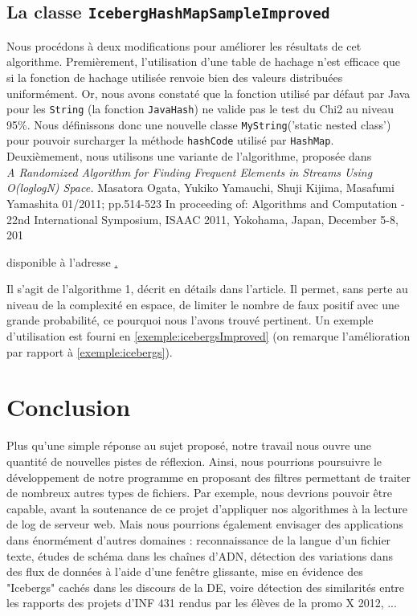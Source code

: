 \documentclass[12pt,a4paper,titlepage]{article}
\newcommand{\class}[1]{\texttt{#1}}
\begin{document}
\subsection{La classe \class{IcebergHashMapSampleImproved}}

Nous procédons à deux modifications pour améliorer les résultats de cet algorithme. Premièrement, l'utilisation d'une table de hachage n'est efficace que si la fonction de hachage utilisée renvoie bien des valeurs distribuées uniformément. Or, nous avons constaté que la fonction utilisé par défaut par Java pour les \class{String} (la fonction \class{JavaHash}) ne valide pas le test du Chi2 au niveau 95\%. Nous définissons donc une nouvelle classe \class{MyString}('static nested class') pour pouvoir surcharger la méthode \class{hashCode} utilisé par \class{HashMap}.\\

Deuxièmement, nous utilisons une variante de l'algorithme, proposée dans\\

\textit{A Randomized Algorithm for Finding Frequent Elements in Streams Using O(loglogN) Space.}
Masatora Ogata, Yukiko Yamauchi, Shuji Kijima, Masafumi Yamashita
01/2011; pp.514-523 In proceeding of: Algorithms and Computation - 22nd International Symposium, ISAAC 2011, Yokohama, Japan, December 5-8, 201

\noindent disponible à l'adresse
\href{http://www.google.fr/search?tbo=p&tbm=bks&q=isbn:3642255906}.


\noindent Il s'agit de l'algorithme 1, décrit en détails dans l'article. Il permet, sans perte au niveau de la complexité en espace, de limiter le nombre de faux positif avec une grande probabilité, ce pourquoi nous l'avons trouvé pertinent. Un exemple d'utilisation est fourni en \ref{exemple:icebergsImproved} (on remarque l'amélioration par rapport à \ref{exemple:icebergs}).



\newpage
\section*{Conclusion}

Plus qu'une simple réponse au sujet proposé, notre travail nous ouvre une quantité de nouvelles pistes de réflexion. Ainsi, nous pourrions poursuivre le développement de notre programme en proposant des filtres permettant de traiter de nombreux autres types de fichiers. Par exemple, nous devrions pouvoir être capable, avant la soutenance de ce projet d'appliquer nos algorithmes à la lecture de log de serveur web. Mais nous pourrions également envisager des applications dans énormément d'autres domaines : reconnaissance de la langue d'un fichier texte, études de schéma dans les chaînes d'ADN, détection des variations dans des flux de données à l'aide d'une fenêtre glissante, mise en évidence des "Icebergs" cachés dans les discours de la DE, voire détection des similarités entre les rapports des projets d'INF 431 rendus par les élèves de la promo X 2012, ...
\end{document}
